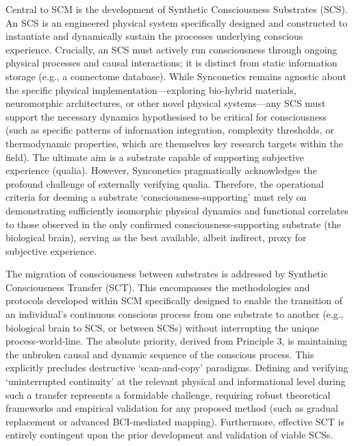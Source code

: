 \documentclass[10pt]{article}
\begin{document}
\begin{sloppypar}
  Central to SCM is the development of Synthetic Consciousness Substrates (SCS). An SCS is an engineered physical system specifically designed and constructed to instantiate and dynamically sustain the processes underlying conscious experience. Crucially, an SCS must actively run consciousness through ongoing physical processes and causal interactions; it is distinct from static information storage (e.g., a connectome database). While Synconetics remains agnostic about the specific physical implementation—exploring bio-hybrid materials, neuromorphic architectures, or other novel physical systems—any SCS must support the necessary dynamics hypothesised to be critical for consciousness (such as specific patterns of information integration, complexity thresholds, or thermodynamic properties, which are themselves key research targets within the field). The ultimate aim is a substrate capable of supporting subjective experience (qualia). However, Synconetics pragmatically acknowledges the profound challenge of externally verifying qualia. Therefore, the operational criteria for deeming a substrate ‘consciousness-supporting’ must rely on demonstrating sufficiently isomorphic physical dynamics and functional correlates to those observed in the only confirmed consciousness-supporting substrate (the biological brain), serving as the best available, albeit indirect, proxy for subjective experience.

  The migration of consciousness between substrates is addressed by Synthetic Consciousness Transfer (SCT). This encompasses the methodologies and protocols developed within SCM specifically designed to enable the transition of an individual’s continuous conscious process from one substrate to another (e.g., biological brain to SCS, or between SCSs) without interrupting the unique process-world-line. The absolute priority, derived from Principle 3, is maintaining the unbroken causal and dynamic sequence of the conscious process. This explicitly precludes destructive ‘scan-and-copy’ paradigms. Defining and verifying ‘uninterrupted continuity’ at the relevant physical and informational level during such a transfer represents a formidable challenge, requiring robust theoretical frameworks and empirical validation for any proposed method (such as gradual replacement or advanced BCI-mediated mapping). Furthermore, effective SCT is entirely contingent upon the prior development and validation of viable SCSs.


\end{sloppypar}
\end{document}
